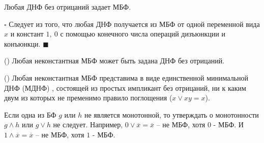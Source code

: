  \begin{Corollary}
    Любая ДНФ без отрицаний задает МБФ.
  \end{Corollary}
    $\square$
    Следует из того, что любая ДНФ получается из МБФ от одной переменной вида $x$ и констант $1,\ 0$
    с помощью конечного числа операций дизъюнкции и конъюнкци.
    $\blacksquare$
  \begin{Corollary}
    (\cite{Moschenski-2001}) Любая неконстантная МБФ может быть задана ДНФ без отрицаний.
  \end{Corollary}
  \begin{Corollary}
    (\cite{MDNF})
    Любая неконстантная МБФ представима в виде единственной
    минимальной ДНФ (МДНФ) , состоящей из простых импликант без отрицаний, 
    ни к каким двум из которых не пременимо правило поглощения 
    ($x \vee xy = x$).
  \end{Corollary}
  \begin{Remark}
    Если одна из БФ $g$ или $h$ не является монотонной, то утверждать о монотонности 
    $g \wedge h$ или $g \vee h$ не следует.
    Например, $0 \vee \overline{x} = \overline{x}$ -- не МБФ, хотя $0$ - МБФ.
    И $1 \wedge \overline{x} = \overline{x}$ -- не МБФ, хотя $1$ - МБФ.
   \end{Remark}

